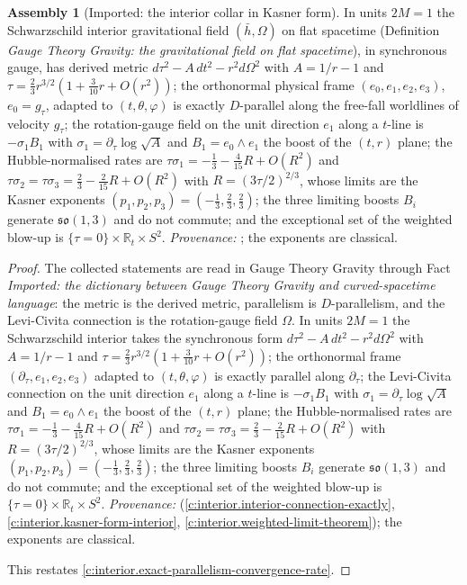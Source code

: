 \documentclass[11pt]{article}
\theoremstyle{definition}
\newtheorem{assembled}[theorem]{Assembly}
\theoremstyle{plain}
\newcommand{\changedmark}[2]{\marginpar{\raggedright\scriptsize\color{#1}#2}}
\providecommand{\R}{}\renewcommand{\R}{\mathbb{R}}
\providecommand{\hb}{}\renewcommand{\hb}{\bar{h}}
\begin{document}
\begin{assembled}[Imported: the interior collar in Kasner form]\label{c:singularity.imported-interior-collar-kasner-form}
\changedmark{BurntOrange}{changed since the deposit}
In units $2M = 1$ the Schwarzschild interior gravitational field $(\hb, \Omega)$ on flat spacetime (Definition \emph{Gauge Theory Gravity: the gravitational field on flat spacetime}), in synchronous gauge, has derived metric $d\tau^2 - A\,dt^2 - r^2 d\Omega^2$ with $A = 1/r - 1$ and $\tau = \tfrac23 r^{3/2}(1 + \tfrac{3}{10}r + O(r^2))$; the orthonormal physical frame $(e_0, e_1, e_2, e_3)$, $e_0 = g_\tau$, adapted to $(t, \theta, \varphi)$ is exactly $D$-parallel along the free-fall worldlines of velocity $g_\tau$; the rotation-gauge field on the unit direction $e_1$ along a $t$-line is $-\sigma_1 B_1$ with $\sigma_1 = \partial_\tau \log\sqrt{A}$ and $B_1 = e_0 \wedge e_1$ the boost of the $(t, r)$ plane; the Hubble-normalised rates are $\tau\sigma_1 = -\tfrac13 - \tfrac{4}{15}R + O(R^2)$ and $\tau\sigma_2 = \tau\sigma_3 = \tfrac23 - \tfrac{2}{15}R + O(R^2)$ with $R = (3\tau/2)^{2/3}$, whose limits are the Kasner exponents $(p_1, p_2, p_3) = (-\tfrac13, \tfrac23, \tfrac23)$; the three limiting boosts $B_i$ generate $\mathfrak{so}(1,3)$ and do not commute; and the exceptional set of the weighted blow-up is $\{\tau = 0\} \times \R_t \times S^2$. \emph{Provenance:} \cite[Lemmas 5.1 to 5.3, Def.~5.5, Thm.~5.6]{ButlerT6}; the exponents are classical.
\end{assembled}
\begin{proof}
The collected statements are read in Gauge Theory Gravity through Fact \emph{Imported: the dictionary between Gauge Theory Gravity and curved-spacetime language}: the metric is the derived metric, parallelism is $D$-parallelism, and the Levi-Civita connection is the rotation-gauge field $\Omega$. In units $2M = 1$ the Schwarzschild interior takes the synchronous form $d\tau^2 - A\,dt^2 - r^2 d\Omega^2$ with $A = 1/r - 1$ and $\tau = \tfrac23 r^{3/2}(1 + \tfrac{3}{10}r + O(r^2))$; the orthonormal frame $(\partial_\tau, e_1, e_2, e_3)$ adapted to $(t, \theta, \varphi)$ is exactly parallel along $\partial_\tau$; the Levi-Civita connection on the unit direction $e_1$ along a $t$-line is $-\sigma_1 B_1$ with $\sigma_1 = \partial_\tau \log\sqrt{A}$ and $B_1 = e_0 \wedge e_1$ the boost of the $(t, r)$ plane; the Hubble-normalised rates are $\tau\sigma_1 = -\tfrac13 - \tfrac{4}{15}R + O(R^2)$ and $\tau\sigma_2 = \tau\sigma_3 = \tfrac23 - \tfrac{2}{15}R + O(R^2)$ with $R = (3\tau/2)^{2/3}$, whose limits are the Kasner exponents $(p_1, p_2, p_3) = (-\tfrac13, \tfrac23, \tfrac23)$; the three limiting boosts $B_i$ generate $\mathfrak{so}(1,3)$ and do not commute; and the exceptional set of the weighted blow-up is $\{\tau = 0\} \times \R_t \times S^2$. \emph{Provenance:} \cite[Lemmas 5.1 to 5.3, Def.~5.5, Thm.~5.6]{ButlerT6} (\ref{c:interior.interior-connection-exactly}, \ref{c:interior.kasner-form-interior}, \ref{c:interior.weighted-limit-theorem}); the exponents are classical.

This restates \ref{c:interior.exact-parallelism-convergence-rate}.

\end{proof}
\end{document}
